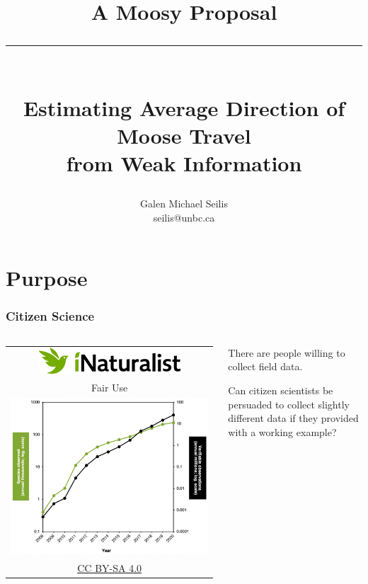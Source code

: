 \documentclass[compress, aspectratio=169]{beamer}
\title{A Moosy Proposal\\ \vspace{-0.3cm} \noindent\rule{5cm}{0.4pt}\\ Estimating Average Direction of Moose Travel \\ from Weak Information}
\author{Galen Michael Seilis \\ {\tiny seilis@unbc.ca}}
\begin{document}
\begin{frame}
	\titlepage
\end{frame}



\section{Purpose}

\begin{frame}
	\frametitle{Citizen Science}
	
	\begin{columns}
	\begin{column}{0.5\textwidth}
	\begin{tabular}{c}
	\includegraphics[scale=0.4]{inaturalist.png} \\
	\tiny Fair Use \\
	\includegraphics[scale=0.3]{inaturalist_growth.png}\\
	\tiny \href{https://commons.wikimedia.org/wiki/File:Line_graph_of_iNaturalist_activity.png}{CC BY-SA 4.0}\\
	\end{tabular}
	\end{column}
	\begin{column}{0.5\textwidth}
	\begin{tcolorbox}[title=Observation, colframe=UNBCGreen]
	There are people willing to collect field data.
	\end{tcolorbox}
	
	\begin{qmarker}
	Can citizen scientists be persuaded to collect slightly different data if they provided with a working example?
	\end{qmarker}
	\end{column}
	\end{columns}
\end{frame}
\end{document}

